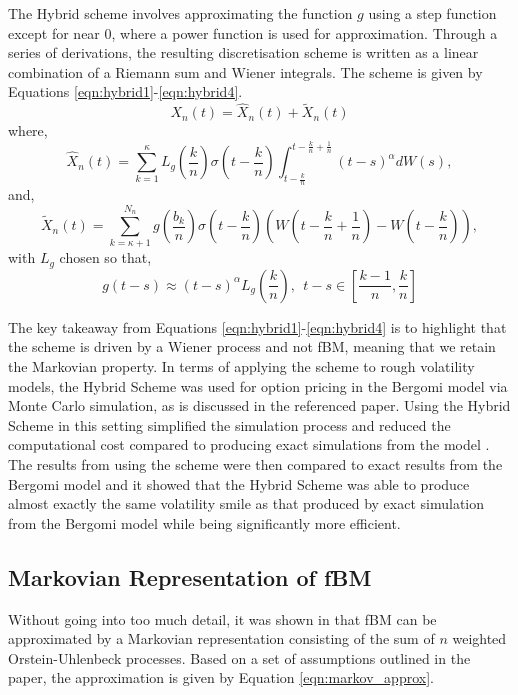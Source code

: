 \documentclass[12pt,oneside]{article}
\begin{document}
The Hybrid scheme involves approximating the function $g$ using a step function except for near 0, where a power function is used for approximation. Through a series of derivations, the resulting discretisation scheme is written as a linear combination of a Riemann sum and Wiener integrals. The scheme is given by Equations
\ref{eqn:hybrid1}-\ref{eqn:hybrid4}.  
\begin{equation}
\label{eqn:hybrid1}
X_n(t) = \hat{X}_n(t) + \tilde{X}_n(t)
\end{equation}
where,
\begin{equation}
\label{eqn:hybrid2}
\hat{X}_n(t) = \sum_{k=1}^{\kappa} L_g(\frac{k}{n}) \sigma (t-\frac{k}{n}) \int_{t-\frac{k}{n}}^{t-\frac{k}{n}+\frac{1}{n}}(t-s)^\alpha dW(s),
\end{equation}
and,
\begin{equation}
\label{eqn:hybrid3}
\tilde{X}_n(t)=\sum_{k=\kappa+1}^{N_n}g(\frac{b_k}{n})\sigma(t-\frac{k}{n})(W(t-\frac{k}{n}+\frac{1}{n})-W(t-\frac{k}{n})),
\end{equation}
with $L_g$ chosen so that,
\begin{equation}
\label{eqn:hybrid4}
g(t-s) \approx (t-s)^\alpha L_g(\frac{k}{n}), \ \ t-s \in [\frac{k-1}{n},\frac{k}{n}]
\end{equation}

The key takeaway from Equations \ref{eqn:hybrid1}-\ref{eqn:hybrid4} is to highlight that the scheme is driven by a Wiener process and not fBM, meaning that we retain the Markovian property. In terms of applying the scheme to rough volatility models, the Hybrid Scheme was used for option pricing in the Bergomi model via Monte Carlo simulation, as is discussed in the referenced paper. Using the Hybrid Scheme in this setting simplified the simulation process and reduced the computational cost compared to producing exact simulations from the model \cite[Page~20]{Bennedsen_2017}. The results from using the scheme were then compared to exact results from the Bergomi model and it showed that the Hybrid Scheme was able to produce almost exactly the same volatility smile as that produced by exact simulation from the Bergomi model while being significantly more efficient.

\subsection{Markovian Representation of fBM}
\label{subsec:markovian_rep_fBm}
Without going into too much detail, it was shown in \cite{harms2020strong} that fBM can be approximated by a Markovian representation consisting of the sum of $n$ weighted Orstein-Uhlenbeck processes.  Based on a set of assumptions outlined in the paper, the approximation is given by Equation \ref{eqn:markov_approx}.
\end{document}
